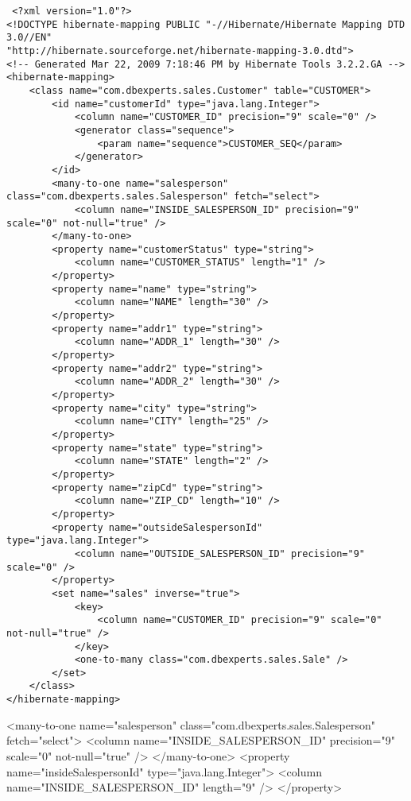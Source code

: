 \begin{verbatim}
 <?xml version="1.0"?>
<!DOCTYPE hibernate-mapping PUBLIC "-//Hibernate/Hibernate Mapping DTD 3.0//EN"
"http://hibernate.sourceforge.net/hibernate-mapping-3.0.dtd">
<!-- Generated Mar 22, 2009 7:18:46 PM by Hibernate Tools 3.2.2.GA -->
<hibernate-mapping>
    <class name="com.dbexperts.sales.Customer" table="CUSTOMER">
        <id name="customerId" type="java.lang.Integer">
            <column name="CUSTOMER_ID" precision="9" scale="0" />
            <generator class="sequence">
                <param name="sequence">CUSTOMER_SEQ</param>
            </generator>
        </id>
        <many-to-one name="salesperson" class="com.dbexperts.sales.Salesperson" fetch="select">
            <column name="INSIDE_SALESPERSON_ID" precision="9" scale="0" not-null="true" />
        </many-to-one>
        <property name="customerStatus" type="string">
            <column name="CUSTOMER_STATUS" length="1" />
        </property>
        <property name="name" type="string">
            <column name="NAME" length="30" />
        </property>
        <property name="addr1" type="string">
            <column name="ADDR_1" length="30" />
        </property>
        <property name="addr2" type="string">
            <column name="ADDR_2" length="30" />
        </property>
        <property name="city" type="string">
            <column name="CITY" length="25" />
        </property>
        <property name="state" type="string">
            <column name="STATE" length="2" />
        </property>
        <property name="zipCd" type="string">
            <column name="ZIP_CD" length="10" />
        </property>
        <property name="outsideSalespersonId" type="java.lang.Integer">
            <column name="OUTSIDE_SALESPERSON_ID" precision="9" scale="0" />
        </property>
        <set name="sales" inverse="true">
            <key>
                <column name="CUSTOMER_ID" precision="9" scale="0" not-null="true" />
            </key>
            <one-to-many class="com.dbexperts.sales.Sale" />
        </set>
    </class>
</hibernate-mapping>
\end{verbatim}

 <many-to-one name="salesperson" class="com.dbexperts.sales.Salesperson" fetch="select">
            <column name="INSIDE_SALESPERSON_ID" precision="9" scale="0" not-null="true" />
        </many-to-one>
        <property name="insideSalespersonId" type="java.lang.Integer">
            <column name="INSIDE_SALESPERSON_ID" length="9" />
        </property>
